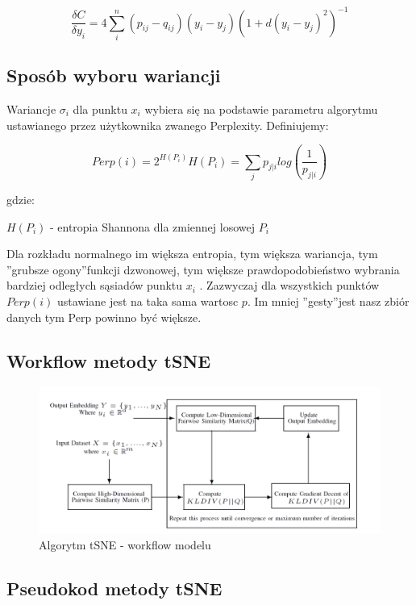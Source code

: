 \documentclass{article}
\begin{document}
\begin{equation}
\frac{\delta C}{\delta y_i} = 4 \sum_i^n (p_{ij} - q_{ij})(y_i - y_j)(1 + d(y_i - y_j)^2)^{-1}
\end{equation}

\subsection{Sposób wyboru wariancji}

Wariancje $\sigma_i$ dla punktu $x_i$ wybiera się na podstawie parametru algorytmu
ustawianego przez użytkownika zwanego Perplexity. Definiujemy:

\begin{equation}
    Perp(i) = 2^{H(P_i)} H(P_i) = \sum_j p_{j|i} log (\frac{1}{p_{j|i}})
\end{equation}

gdzie:

$H(P_i)$ - entropia Shannona dla zmiennej losowej $P_i$

Dla rozkładu normalnego im większa entropia, tym większa wariancja, tym
”grubsze ogony”funkcji dzwonowej, tym większe prawdopodobieństwo
wybrania bardziej odległych sąsiadów punktu $x_i$ . Zazwyczaj dla wszystkich
punktów $Perp(i)$ ustawiane jest na taka sama wartosc $p$. Im mniej
”gesty”jest nasz zbiór danych tym Perp powinno być większe.

\subsection{Workflow metody tSNE}

\begin{figure}[h]
\includegraphics[scale=0.52]{algorithm_TSNE.PNG}
\caption{Algorytm tSNE - workflow modelu}
\end{figure}

\subsection{Pseudokod metody tSNE}
\end{document}
